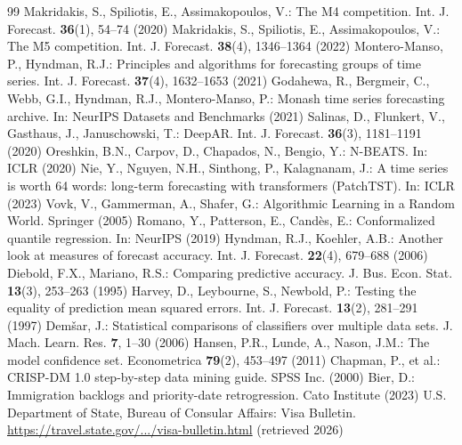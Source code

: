 \documentclass[runningheads]{llncs}
\begin{document}
\begin{thebibliography}{99}
 Makridakis, S., Spiliotis, E., Assimakopoulos, V.: The M4 competition. Int. J. Forecast. \textbf{36}(1), 54--74 (2020)
 Makridakis, S., Spiliotis, E., Assimakopoulos, V.: The M5 competition. Int. J. Forecast. \textbf{38}(4), 1346--1364 (2022)
 Montero-Manso, P., Hyndman, R.J.: Principles and algorithms for forecasting groups of time series. Int. J. Forecast. \textbf{37}(4), 1632--1653 (2021)
 Godahewa, R., Bergmeir, C., Webb, G.I., Hyndman, R.J., Montero-Manso, P.: Monash time series forecasting archive. In: NeurIPS Datasets and Benchmarks (2021)
 Salinas, D., Flunkert, V., Gasthaus, J., Januschowski, T.: DeepAR. Int. J. Forecast. \textbf{36}(3), 1181--1191 (2020)
 Oreshkin, B.N., Carpov, D., Chapados, N., Bengio, Y.: N-BEATS. In: ICLR (2020)
 Nie, Y., Nguyen, N.H., Sinthong, P., Kalagnanam, J.: A time series is worth 64 words: long-term forecasting with transformers (PatchTST). In: ICLR (2023)
 Vovk, V., Gammerman, A., Shafer, G.: Algorithmic Learning in a Random World. Springer (2005)
 Romano, Y., Patterson, E., Cand\`es, E.: Conformalized quantile regression. In: NeurIPS (2019)
 Hyndman, R.J., Koehler, A.B.: Another look at measures of forecast accuracy. Int. J. Forecast. \textbf{22}(4), 679--688 (2006)
 Diebold, F.X., Mariano, R.S.: Comparing predictive accuracy. J. Bus. Econ. Stat. \textbf{13}(3), 253--263 (1995)
 Harvey, D., Leybourne, S., Newbold, P.: Testing the equality of prediction mean squared errors. Int. J. Forecast. \textbf{13}(2), 281--291 (1997)
 Dem\v{s}ar, J.: Statistical comparisons of classifiers over multiple data sets. J. Mach. Learn. Res. \textbf{7}, 1--30 (2006)
 Hansen, P.R., Lunde, A., Nason, J.M.: The model confidence set. Econometrica \textbf{79}(2), 453--497 (2011)
 Chapman, P., et al.: CRISP-DM 1.0 step-by-step data mining guide. SPSS Inc. (2000)
 Bier, D.: Immigration backlogs and priority-date retrogression. Cato Institute (2023)
 U.S. Department of State, Bureau of Consular Affairs: Visa Bulletin. \url{https://travel.state.gov/.../visa-bulletin.html} (retrieved 2026)
\end{thebibliography}
\end{document}
